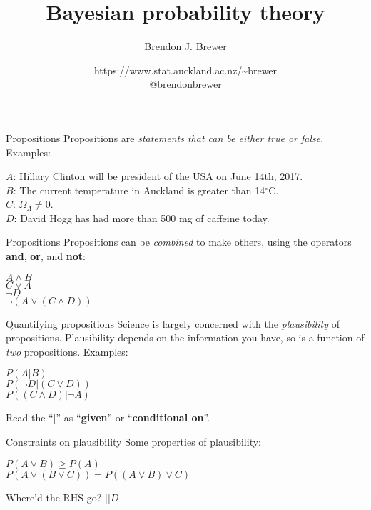 \documentclass{beamer}
\author{Brendon J. Brewer}
\title{Bayesian probability theory}
\institute{Department of Statistics, The University of Auckland}
\date{{\color{blue} https://www.stat.auckland.ac.nz/\~{ }brewer}\\
\vspace{10pt}
{\color{blue} @brendonbrewer}}
\begin{document}
\begin{frame}[t,plain]
\titlepage
\end{frame}

\begin{frame}[t]{Propositions}
Propositions are {\it statements that can be either true or false}.\\
Examples:\vspace{20pt}

$A$: {\small Hillary Clinton will be president of the USA on June 14th, 2017.}\\
$B$: {\small The current temperature in Auckland is greater than 14$^{\circ}$C.}\\
$C$: {\small $\Omega_\Lambda \neq 0$.}\\
$D$: {\small David Hogg has had more than 500 mg of caffeine today.}
\end{frame}

\begin{frame}[t]{Propositions}
Propositions can be {\it combined} to make others, using the operators
{\bf and}, {\bf or}, and {\bf not}: \vspace{20pt}

$A \wedge B$\\
$C \vee A$\\
$\neg D$\\
$\neg (A \vee (C \wedge D))$
\end{frame}

\begin{frame}[t]{Quantifying propositions}
Science is largely concerned with the {\it plausibility} of propositions.
Plausibility depends on the information you have, so is a function of {\it
two} propositions. Examples:\vspace{20pt}

$P(A | B)$\\
$P(\neg D | (C \vee D))$\\
$P((C \wedge D) | \neg A)$\vspace{20pt}

Read the ``$|$'' as ``{\bf given}'' or ``{\bf conditional on}''.
\end{frame}


\begin{frame}[t]{Constraints on plausibility}
Some properties of plausibility:\vspace{20pt}

$P(A \vee B) \geq P(A)$\\
$P(A \vee (B \vee C)) = P((A \vee B) \vee C)$\vspace{20pt}

Where'd the RHS go? $|| D$
\end{frame}
\end{document}
